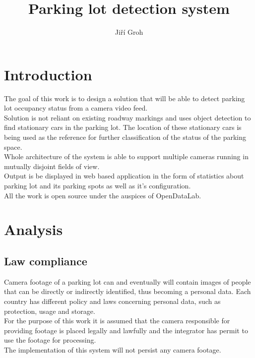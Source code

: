 \documentclass[thesis=M,english]{FITthesis}[2019/03/06]
\title{Parking lot detection system}
\author{Ji{\v r}í Groh} %
\begin{document}

\chapter{Introduction}
The goal of this work is to design a solution that will be able to detect parking lot occupancy status from a camera video feed. \\

Solution is not reliant on existing roadway markings and uses object detection to find stationary cars in the parking lot. The location of these stationary cars is being used as the reference for further classification of the status of the parking space. \\

Whole architecture of the system is able to support multiple cameras running in mutually disjoint fields of view.\\

Output is be displayed in web based application in the form of statistics about parking lot and its parking spots as well as it's configuration.\\



All the work is open source under the auspices of OpenDataLab.




\chapter{Analysis}
\section{Law compliance}
Camera footage of a parking lot can and eventually will contain images of people that can be directly or indirectly identified, thus becoming a personal data. Each country has different policy and laws concerning personal data, such as protection, usage and storage.\\

For the purpose of this work it is assumed that the camera responsible for providing footage is placed legally and lawfully and the integrator has permit to use the footage for processing.\\

The implementation of this system will not persist any camera footage.
\end{document}
